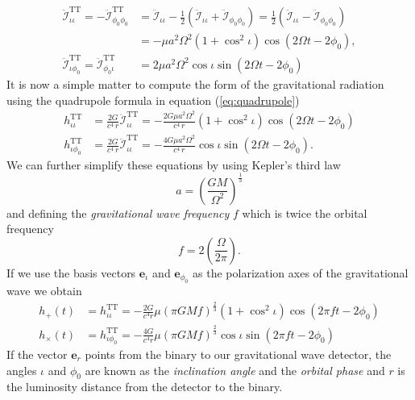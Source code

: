 \begin{equation}
\begin{split}
\ddot{\mathcal{I}}_{\iota\iota}^\mathrm{TT} = - \ddot{\mathcal{I}}_{\phi_0\phi_0}^\mathrm{TT} &= 
\ddot{\mathcal{I}}_{\iota\iota} - \frac{1}{2}
\left( \ddot{\mathcal{I}}_{\iota\iota} + 
\ddot{\mathcal{I}}_{\phi_0\phi_0} \right) = 
\frac{1}{2} \left(  \ddot{\mathcal{I}}_{\iota\iota} - 
\ddot{\mathcal{I}}_{\phi_0\phi_0}
\right) \\
&= - \mu a^2\Omega^2 \left(1 + \cos^2\iota\right) \cos\left(2\Omega t - 2\phi_0\right) ,\\
\ddot{\mathcal{I}}_{\iota\phi_0}^\mathrm{TT} = \ddot{\mathcal{I}}_{\phi_0\iota}^\mathrm{TT}  &=
2\mu a^2 \Omega^2 \cos\iota \sin(2\Omega t - 2\phi_0)
\end{split}
\end{equation}
It is now a simple matter to compute the form of the gravitational
radiation using the quadrupole formula in equation (\ref{eq:quadrupole})
\begin{align}
h_{\iota\iota}^\mathrm{TT} &= 
\frac{2G}{c^4\, r} \ddot{\mathcal{I}}_{\iota\iota}^\mathrm{TT} =
-\frac{2G\mu a^2\Omega^2}{c^4\, r} (1 + \cos^2\iota) \cos\left(2\Omega t - 2\phi_0\right) \\
h_{\iota\phi_0}^\mathrm{TT} &= 
\frac{2G}{c^4\, r} \ddot{\mathcal{I}}_{\iota\iota}^\mathrm{TT} =
-\frac{4G \mu a^2 \Omega^2}{c^4\, r} \cos\iota \sin\left(2\Omega t - 2\phi_0\right).
\end{align}
We can further simplify these equations by using Kepler's third law
\begin{equation}
a = \left(\frac{GM}{\Omega^2}\right)^\frac{1}{3}
\label{eq:kepleragain}
\end{equation}
and defining the \emph{gravitational wave frequency} $f$ which is twice the
orbital frequency 
\begin{equation}
f  = 2\left(\frac{\Omega}{2\pi}\right).
\end{equation}
If we use the basis vectors $\boldsymbol{e}_{\iota}$ and
$\boldsymbol{e}_{\phi_0}$ as the polarization axes of the gravitational wave
we obtain
\begin{align}
h_{+}(t) &= h_{\iota\iota}^\mathrm{TT} = - \frac{2G}{c^4 r} \mu (\pi G M
f)^\frac{2}{3} (1 + \cos^2 \iota ) \cos(2\pi f t - 2 \phi_0) \\
h_{\times}(t) &= h_{\iota\phi_0}^\mathrm{TT} = - \frac{4G}{c^4 r} \mu (\pi G M
f)^\frac{2}{3} \cos\iota \sin(2\pi f t - 2 \phi_0)
\end{align}
If the vector $\boldsymbol{e}_r$ points from the binary to our gravitational
wave detector, the angles $\iota$ and $\phi_0$ are known as the
\emph{inclination angle} and the \emph{orbital phase} and $r$ is the
luminosity distance from the detector to the binary.

